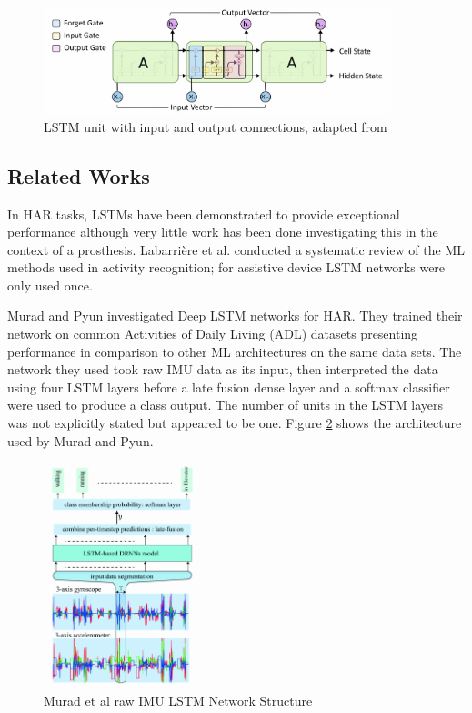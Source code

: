\documentclass[sensors,article,submit,moreauthors,pdftex]{Definitions/mdpi}
\begin{document}
\begin{figure}[!htb]
    \centering
    \includegraphics[width=0.9\textwidth]{Figures/lstm/lstm_internal_operation.jpg}
    \caption{LSTM unit with input and output connections, adapted from\cite{Olah2015}}
    \label{fig:lstm_unit}
\end{figure}

\subsection{Related Works}
In HAR tasks, LSTMs have been demonstrated to provide exceptional performance\cite{Murad2017} although very little work has been done investigating this in the context of a prosthesis. Labarri\`ere et al. conducted a systematic review of the ML methods used in activity recognition; for assistive device LSTM networks were only used once\cite{Labarriere2020}.

Murad and Pyun investigated Deep LSTM networks for HAR\cite{Murad2017}. They trained their network on common Activities of Daily Living (ADL) datasets presenting performance in comparison to other ML architectures on the same data sets. The network they used took raw IMU data as its input, then interpreted the data using four LSTM layers before a late fusion dense layer and a softmax classifier were used to produce a class output. The number of units in the LSTM layers was not explicitly stated but appeared to be one. Figure \ref{fig:murad_lst_network_structure} shows the architecture used by Murad and Pyun. 

\begin{figure}[!htb]
    \centering
    \includegraphics[width=0.4\textwidth]{Figures/lstm/murad_lstm_architecture.jpg}
    \caption{Murad et al raw IMU LSTM Network Structure\cite{Murad2017}}
    \label{fig:murad_lst_network_structure}
\end{figure}
\end{document}
